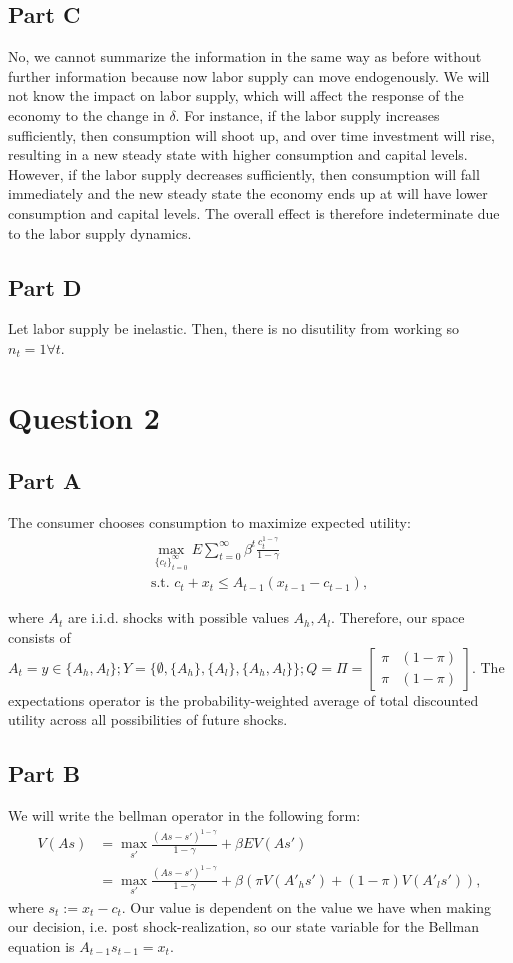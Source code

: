 \documentclass[11pt]{article} %
\begin{document}
\subsection{Part C}
No, we cannot summarize the information in the same way as before without further information because now labor supply can move endogenously. We will not know the impact on labor supply, which will affect the response of the economy to the change in $\delta$. For instance, if the labor supply increases sufficiently, then consumption will shoot up, and over time investment will rise, resulting in a new steady state with higher consumption and capital levels. However, if the labor supply decreases sufficiently, then consumption will fall immediately and the new steady state the economy ends up at will have lower consumption and capital levels. The overall effect is therefore indeterminate due to the labor supply dynamics.

\subsection{Part D}

Let labor supply be inelastic. Then, there is no disutility from working so $n_t = 1 \forall t.$

\section{Question 2}
\subsection{Part A}
The consumer chooses consumption to maximize expected utility:
\begin{align*}
\max_{\{c_t\}_{t=0}^{\infty}} E\sum_{t=0}^{\infty}\beta^t \frac{c_t^{1-\gamma}}{1-\gamma}\\
\text{s.t. } c_t + x_t \leq A_{t-1}(x_{t-1} - c_{t-1}),
\end{align*}

where $A_t$ are i.i.d. shocks with possible values $A_h,A_l$. Therefore, our space consists of $A_t = y \in \{ A_h,A_l \}; Y = \{ \emptyset, \{A_h\},\{ A_l\}, \{ A_h,A_l\}\}; Q = \Pi = \begin{bmatrix} \pi & (1-\pi) \\ \pi & (1-\pi)\end{bmatrix}$. The expectations operator is the probability-weighted average of total discounted utility across all possibilities of future shocks. 
\subsection{Part B}
We will write the bellman operator in the following form:
\begin{align*}
V(As) &= \max_{s'} \frac{(As - s')^{1-\gamma}}{1-\gamma} + \beta EV(As')\\
&= \max_{s'} \frac{(As - s')^{1-\gamma}}{1-\gamma} + \beta (\pi V(A'_h s') + (1-\pi) V(A'_l s' )),
\end{align*}
where $s_t := x_t - c_t$. Our value is dependent on the value we have when making our decision, i.e. post shock-realization, so our state variable for the Bellman equation is $A_{t-1}s_{t-1} = x_t$.
\end{document}

